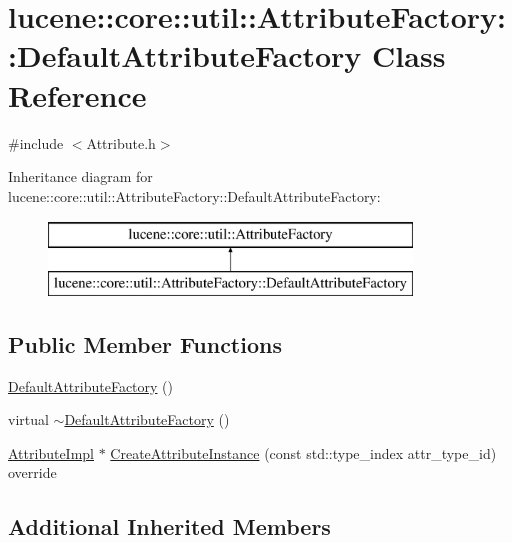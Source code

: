 \hypertarget{classlucene_1_1core_1_1util_1_1AttributeFactory_1_1DefaultAttributeFactory}{}\section{lucene\+:\+:core\+:\+:util\+:\+:Attribute\+Factory\+:\+:Default\+Attribute\+Factory Class Reference}
\label{classlucene_1_1core_1_1util_1_1AttributeFactory_1_1DefaultAttributeFactory}


{\ttfamily \#include $<$Attribute.\+h$>$}

Inheritance diagram for lucene\+:\+:core\+:\+:util\+:\+:Attribute\+Factory\+:\+:Default\+Attribute\+Factory\+:\begin{figure}[H]
\begin{center}
\leavevmode
\includegraphics[height=2.000000cm]{classlucene_1_1core_1_1util_1_1AttributeFactory_1_1DefaultAttributeFactory}
\end{center}
\end{figure}
\subsection*{Public Member Functions}
\begin{DoxyCompactItemize}
\item 
\mbox{\hyperlink{classlucene_1_1core_1_1util_1_1AttributeFactory_1_1DefaultAttributeFactory_aa5249c715ab28f13919c833b779e6351}{Default\+Attribute\+Factory}} ()
\item 
virtual \mbox{\hyperlink{classlucene_1_1core_1_1util_1_1AttributeFactory_1_1DefaultAttributeFactory_a564f172e63c8c5c4f01cf9ec95a10e5f}{$\sim$\+Default\+Attribute\+Factory}} ()
\item 
\mbox{\hyperlink{classlucene_1_1core_1_1util_1_1AttributeImpl}{Attribute\+Impl}} $\ast$ \mbox{\hyperlink{classlucene_1_1core_1_1util_1_1AttributeFactory_1_1DefaultAttributeFactory_af9b68def67fc7995d2c5e9f3d1560f5e}{Create\+Attribute\+Instance}} (const std\+::type\+\_\+index attr\+\_\+type\+\_\+id) override
\end{DoxyCompactItemize}
\subsection*{Additional Inherited Members}



